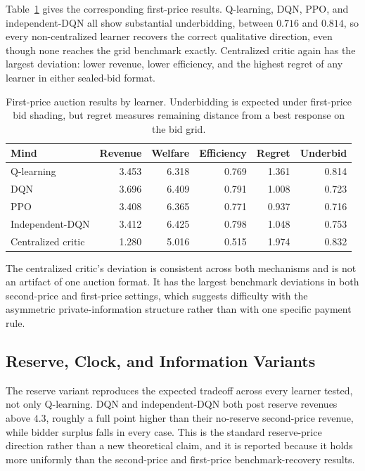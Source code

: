 \documentclass[11pt]{article}
\begin{document}
Table~\ref{tab:auction-crossmind-first} gives the corresponding first-price
results. Q-learning, DQN, PPO, and independent-DQN all show substantial
underbidding, between \(0.716\) and \(0.814\), so every non-centralized learner
recovers the correct qualitative direction, even though none reaches the grid
benchmark exactly. Centralized critic again has the largest deviation: lower
revenue, lower efficiency, and the highest regret of any learner in either
sealed-bid format.

\begin{table}[h]
\centering
\begin{tabular}{lrrrrr}
\toprule
Mind & Revenue & Welfare & Efficiency & Regret & Underbid \\
\midrule
Q-learning & 3.453 & 6.318 & 0.769 & 1.361 & 0.814 \\
DQN & 3.696 & 6.409 & 0.791 & 1.008 & 0.723 \\
PPO & 3.408 & 6.365 & 0.771 & 0.937 & 0.716 \\
Independent-DQN & 3.412 & 6.425 & 0.798 & 1.048 & 0.753 \\
Centralized critic & 1.280 & 5.016 & 0.515 & 1.974 & 0.832 \\
\bottomrule
\end{tabular}
\caption{First-price auction results by learner. Underbidding is expected under first-price bid shading, but regret measures remaining distance from a best response on the bid grid.}
\label{tab:auction-crossmind-first}
\end{table}

The centralized critic's deviation is consistent across both mechanisms and is
not an artifact of one auction format. It has the largest benchmark deviations
in both second-price and first-price settings, which suggests difficulty with
the asymmetric private-information structure rather than with one specific
payment rule.

\subsection{Reserve, Clock, and Information Variants}

The reserve variant reproduces the expected tradeoff across every learner
tested, not only Q-learning. DQN and independent-DQN both post reserve revenues
above \(4.3\), roughly a full point higher than their no-reserve second-price
revenue, while bidder surplus falls in every case. This is the standard
reserve-price direction rather than a new theoretical claim, and it is reported
because it holds more uniformly than the second-price and first-price
benchmark-recovery results.
\end{document}
